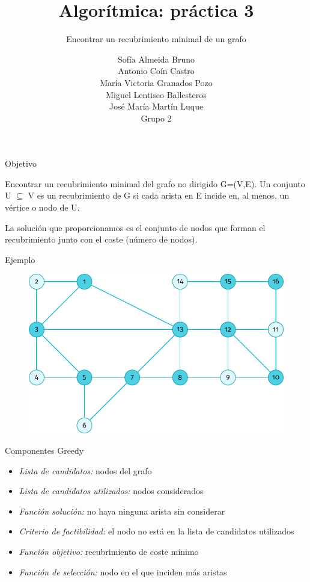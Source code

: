 \documentclass[spanish]{beamer}
\title{Algorítmica: práctica 3}
\subtitle{Encontrar un recubrimiento minimal de un grafo}
\author{Sofía Almeida Bruno\\ Antonio Coín Castro\\ María Victoria Granados Pozo\\ Miguel Lentisco Ballesteros\\ José María Martín Luque\\ \vspace{1em}Grupo 2}
\begin{document}
\maketitle

\begin{frame}{Objetivo}
	
	Encontrar un recubrimiento minimal del grafo no dirigido G=(V,E).
	Un conjunto U $\subseteq$ V es un recubrimiento de G si cada arista en E incide en, al menos, un vértice o nodo de U.
	
	La solución que proporcionamos es el conjunto de nodos que forman el recubrimiento junto con el coste (número de nodos). 
\end{frame}

\begin{frame}{Ejemplo}
	\begin{figure}[H]
		\centering \includegraphics{./img/grafo.pdf}
	\end{figure}
\end{frame}

\begin{frame}{Componentes Greedy}
	\begin{itemize}
		\item \textit{Lista de candidatos:} nodos del grafo
		\item \textit{Lista de candidatos utilizados:} nodos considerados
		\item \textit{Función solución:} no haya ninguna arista sin considerar
		\item \textit{Criterio de factibilidad:} el nodo no está en la lista de candidatos utilizados
		\item \textit{Función objetivo:} recubrimiento de coste mínimo
		\item \textit{Función de selección:} nodo en el que inciden más aristas
		
	\end{itemize}
\end{frame}
\end{document}
